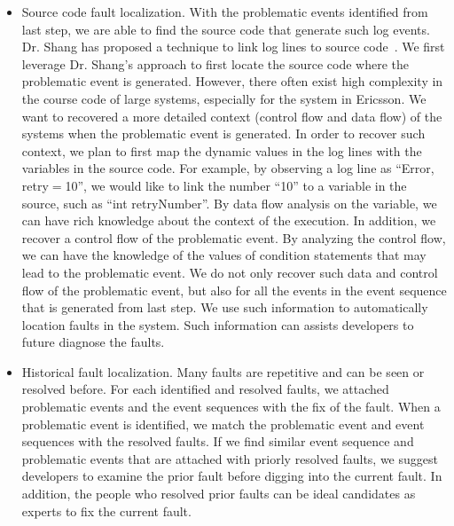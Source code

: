 \begin{enumerate}
\begin{itemize}
		\item Source code fault localization. With the problematic events identified from last step, we are able to find the source code that generate such log events. Dr. Shang has proposed a technique to link log lines to source code~\cite{Shang:2014:ULL:2705615.2706065}. We first leverage Dr. Shang's approach to first locate the source code where the problematic event is generated. However, there often exist high complexity in the course code of large systems, especially for the system in Ericsson. We want to recovered a more detailed context (control flow and data flow) of the systems when the problematic event is generated. In order to recover such context, we plan to first map the dynamic values in the log lines with the variables in the source code. For example, by observing a log line as ``Error, retry$=$10'', we would like to link the number ``10'' to a variable in the source, such as ``int retryNumber''. By data flow analysis on the variable, we can have rich knowledge about the context of the execution. In addition, we recover a control flow of the problematic event. By analyzing the control flow, we can have the knowledge of the values of condition statements that may lead to the problematic event. We do not only recover such data and control flow of the problematic event, but also for all the events in the event sequence that is generated from last step. We use such information to automatically location faults in the system. Such information can assists developers to future diagnose the faults.
		
		\item Historical fault localization. Many faults are repetitive and can be seen or resolved before. For each identified and resolved faults, we attached problematic events and the event sequences with the fix of the fault. When a problematic event is identified, we match the problematic event and event sequences with the resolved faults. If we find similar event sequence and problematic events that are attached with priorly resolved faults, we suggest developers to examine the prior fault before digging into the current fault. In addition, the people who resolved prior faults can be ideal candidates as experts to fix the current fault.
		
	\end{itemize}
\end{enumerate}


